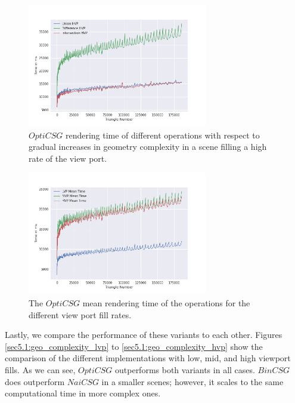 \documentclass[a4paper,11pt,oneside]{article}
\begin{document}
\begin{figure}[H]
	\centering
	\includegraphics[width=0.7\textwidth]{section5/plots/optim_csg_hvp.png}
	\caption{$OptiCSG$ rendering time of different operations with respect to gradual increases in geometry complexity in a scene filling a high rate of the view port.}
	\label{sec5.1:optim_operations_hvp}
\end{figure}
\begin{figure}[H]
	\centering
	\includegraphics[width=0.7\textwidth]{section5/plots/optim_csg_mean.png}
	\caption{The $OptiCSG$ mean rendering time of the operations for the different view port fill rates.}
	\label{sec5.1:bin_operations}
\end{figure}

Lastly, we compare the performance of these variants to each other. Figures \ref{sec5.1:geo_complexity_lvp} to \ref{sec5.1:geo_complexity_hvp} show the comparison of the different implementations with low, mid, and high viewport fills. As we can see, $OptiCSG$ outperforms both variants in all cases. $BinCSG$ does outperform $NaiCSG$ in a smaller scenes; however, it scales to the same computational time in more complex ones.
\end{document}
